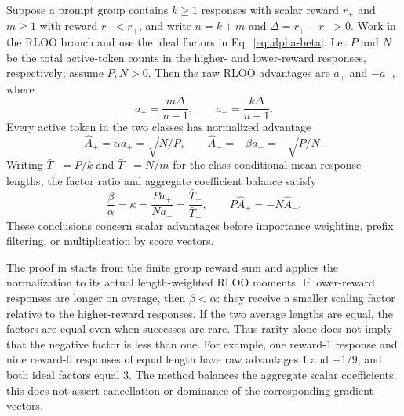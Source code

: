 \begin{proposition}
\label{prop:binary-rloo-normalization}
Suppose a prompt group contains $k\ge1$ responses with scalar reward $r_+$
and $m\ge1$ with reward $r_-<r_+$, and write $n=k+m$ and
$\Delta=r_+-r_->0$. Work in the RLOO branch and use the ideal factors in
Eq.~\eqref{eq:alpha-beta}. Let $P$ and $N$ be the total active-token counts
in the higher- and lower-reward responses, respectively; assume $P,N>0$.
Then the raw RLOO advantages are $a_+$ and $-a_-$, where
\[
    a_+=\frac{m\Delta}{n-1},\qquad
    a_-=\frac{k\Delta}{n-1}.
\]
Every active token in the two classes has normalized advantage
\begin{equation}
    \hat A_+=\alpha a_+=\sqrt{N/P},\qquad
    \hat A_-=-\beta a_-=-\sqrt{P/N}.
    \label{eq:binary-normalized-amplitudes}
\end{equation}
Writing $\bar T_+=P/k$ and $\bar T_-=N/m$ for the class-conditional mean
response lengths, the factor ratio and aggregate coefficient balance satisfy
\begin{equation}
    \frac{\beta}{\alpha}=\kappa
      =\frac{Pa_+}{Na_-}=\frac{\bar T_+}{\bar T_-},\qquad
    P\hat A_+=-N\hat A_-.
    \label{eq:binary-length-balance}
\end{equation}
These conclusions concern scalar advantages before importance weighting,
prefix filtering, or multiplication by score vectors.
\end{proposition}

The proof in  starts from the finite group reward
sum and applies the normalization to its actual length-weighted RLOO
moments. If lower-reward responses are longer on average, then
$\beta<\alpha$: they receive a smaller scaling factor relative to the
higher-reward responses. If the two average lengths are equal, the factors
are equal even when successes are rare. Thus rarity alone does not imply
that the negative factor is less than one. For example, one reward-$1$
response and nine reward-$0$ responses of equal length have raw advantages
$1$ and $-1/9$, and both ideal factors equal $3$.
The method balances the aggregate scalar coefficients; this does not assert
cancellation or dominance of the corresponding gradient vectors.

